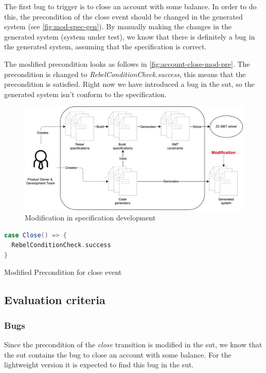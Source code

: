 The first bug to trigger is to close an account with some balance. In order to do this, the precondition of the close event should be changed in the generated system (see \autoref{fig:mod-spec-gen}). By manually making the changes in the generated system (system under test), we know that there is definitely a bug in the generated system, assuming that the specification is correct.

The modified precondition looks as follows in
\autoref{fig:account-close-mod-pre}. The precondition is changed to
\textit{RebelConditionCheck.success}, this means that the precondition is
satisfied. Right now we have introduced a bug in the \gls{sut},
so the generated system isn't conform to the specification.

\begin{figure}[h!]
  \centering
  \includegraphics[width=\linewidth{}]{figures/modified-sut.pdf}
  \caption{Modification in specification development}\label{fig:mod-spec-gen}
\end{figure}
\FloatBarrier

\begin{sourcecode}[h!]
\begin{lstlisting}[language=scala]
case Close() => {
  RebelConditionCheck.success
}
\end{lstlisting}
\caption{Modified Precondition for close event}\label{fig:account-close-mod-pre}
\end{sourcecode}
\FloatBarrier

\subsection{Evaluation criteria}\label{sec:ch4-eval-criteria}

\subsubsection{Bugs}
Since the precondition of the \textit{close} transition is modified in the \gls{sut},
we know that the \gls{sut} contains the bug to close an account with some balance. For
the lightweight version it is expected to find this bug in the \gls{sut}.

